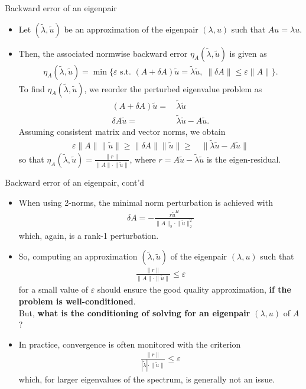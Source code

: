 \documentclass[t,usepdftitle=false]{beamer}
\begin{document}
\begin{frame}{Backward error of an eigenpair}
\begin{itemize}
\item Let $(\tilde{\lambda},\tilde{u})$ be an approximation of the eigenpair $(\lambda,u)$ such that $Au=\lambda u$.
\item Then, the associated normwise backward error $\eta_{A}(\tilde{\lambda},\tilde{u})$ is given as
\begin{align*}
\eta_{A}(\tilde{\lambda},\tilde{u})=\min
\{\varepsilon\text{ s.t. }(A+\delta A)\tilde{u}=\tilde{\lambda}\tilde{u},\;
\|\delta A\|\leq\varepsilon\|A\|\}.
\end{align*}
To find $\eta_{A}(\tilde{\lambda},\tilde{u})$, we reorder the perturbed eigenvalue problem as
\begin{align*}
(A+\delta A)\tilde{u}=&\,\tilde{\lambda}\tilde{u}\\
\delta A\tilde{u}=&\,\tilde{\lambda}\tilde{u}-A\tilde{u}.
\end{align*}
Assuming consistent matrix and vector norms, we obtain
\begin{align*}
\varepsilon\| A\|\|\tilde{u}\|\geq\|\delta A\|\|\tilde{u}\|\geq&\,\|\tilde{\lambda}\tilde{u}-A\tilde{u}\|
\end{align*}
so that $\displaystyle \eta_{A}(\tilde{\lambda},\tilde{u})=\frac{\|r\|}{\| A\|\cdot\|\tilde{u}\|}$,
where
$\displaystyle r=A\tilde{u}-\tilde{\lambda}\tilde{u}$
is the eigen-residual.
\end{itemize}
\end{frame}

\begin{frame}{Backward error of an eigenpair, cont'd}
\begin{itemize}
\item When using 2-norms, the minimal norm perturbation is achieved with
\begin{align*}
\delta A=-\frac{r\tilde{u}^H}{\|A\|_2\cdot\|\tilde{u}\|_2^2}
\end{align*}
which, again, is a rank-1 perturbation.
\item So, computing an approximation $(\tilde{\lambda},\tilde{u})$ of the eigenpair $(\lambda,u)$ such that
\begin{align*}
\frac{\|r\|}{\|A\|\cdot\|\tilde{u}\|}\leq \varepsilon
\end{align*}
for a small value of $\varepsilon$ should ensure the good quality approximation, \textbf{if the problem is well-conditioned}.\vspace{.1cm}\\
But, \textbf{what is the conditioning of solving for an eigenpair} $(\lambda,u)$ of $A$?
\item In practice, convergence is often monitored with the criterion
\begin{align*}
\frac{\|r\|}{|\tilde{\lambda}|\cdot\|\tilde{u}\|}\leq \varepsilon
\end{align*}
which, for larger eigenvalues of the spectrum, is generally not an issue.
\end{itemize}
\end{frame}
\end{document}
